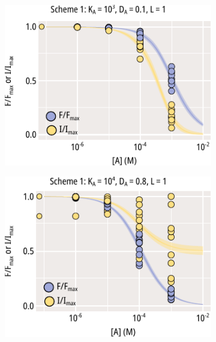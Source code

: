 \begin{figure}[h]
	\centering
	\begin{subfigure}[t]{0.3\textwidth}
		\caption{}\label{ch4fig:scheme_1_ka_shift}
		\centering
		\includegraphics[width=\textwidth]{mwc_scheme_1_ka_shift.pdf}
	\end{subfigure}
	\hfill
	\begin{subfigure}[t]{0.3\textwidth}
		\caption{}\label{ch4fig:scheme_1_da_shift}
		\centering
		\includegraphics[width=\textwidth]{mwc_scheme_1_da_shift.pdf}
	\end{subfigure}
	\hfill
	\begin{subfigure}[t]{0.3\textwidth}
		\caption{}\label{ch4fig:scheme_1_l_shift}

\end{subfigure}
\end{figure}
